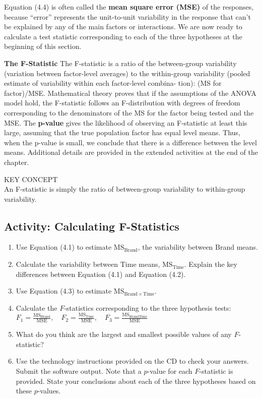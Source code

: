 \documentclass[
]{report}
\theoremstyle{definition}
\theoremstyle{definition}
\theoremstyle{definition}
\theoremstyle{definition}
\theoremstyle{remark}
\begin{document}
Equation (4.4) is often called the \textbf{mean square error (MSE)} of the responses, because ``error'' represents the
unit-to-unit variability in the response that can't be explained by any of the main factors or interactions. We are
now ready to calculate a test statistic corresponding to each of the three hypotheses at the beginning of this section.

\textbf{The F-Statistic} The F-statistic is a ratio of the between-group variability (variation between factor-level
averages) to the within-group variability (pooled estimate of variability within each factor-level combina-
tion): (MS for factor)/MSE. Mathematical theory proves that if the assumptions of the ANOVA model hold,
the F-statistic follows an F-distribution with degrees of freedom corresponding to the denominators of the
MS for the factor being tested and the MSE. The \textbf{p-value} gives the likelihood of observing an F-statistic at
least this large, assuming that the true population factor has equal level means. Thus, when the p-value is
small, we conclude that there is a difference between the level means. Additional details are provided in the
extended activities at the end of the chapter.

KEY CONCEPT\\
An F-statistic is simply the ratio of between-group variability to within-group variability.

\hypertarget{activity-calculating-f-statistics}{%
\subsection{Activity: Calculating F-Statistics}\label{activity-calculating-f-statistics}}

\begin{enumerate}
\def\labelenumi{\arabic{enumi}.}
\setcounter{enumi}{7}
\item
  Use Equation (4.1) to estimate \(\mathrm{MS}_{\mathrm{Brand}}\), the variability between Brand means.
\item
  Calculate the variability between Time means, \(\mathrm{MS}_{\mathrm{Time}}\). Explain the key differences between Equation (4.1) and Equation (4.2).
\item
  Use Equation (4.3) to estimate \(\mathrm{MS}_{\mathrm{Brand}\times\mathrm{Time}}\).
\item
  Calculate the \(F\)-statistics corresponding to the three hypothesis tests:
  \(F_1 = \frac{\mathrm{MS}_{\mathrm{Brand}}}{\mathrm{MSE}},\quad F_2 = \frac{\mathrm{MS}_{\mathrm{Time}}}{\mathrm{MSE}},\quad F_3=\frac{\mathrm{MS}_{\mathrm{BrandTime}}}{\mathrm{MSE}}\)
\item
  What do you think are the largest and smallest possible values of any \(F\)-statistic?
\item
  Use the technology instructions provided on the CD to check your answers. Submit the software output. Note that a \(p\)-value for each \(F\)-statistic is provided. State your conclusions about each of the three hypotheses based on these \(p\)-values.
\end{enumerate}
\end{document}
